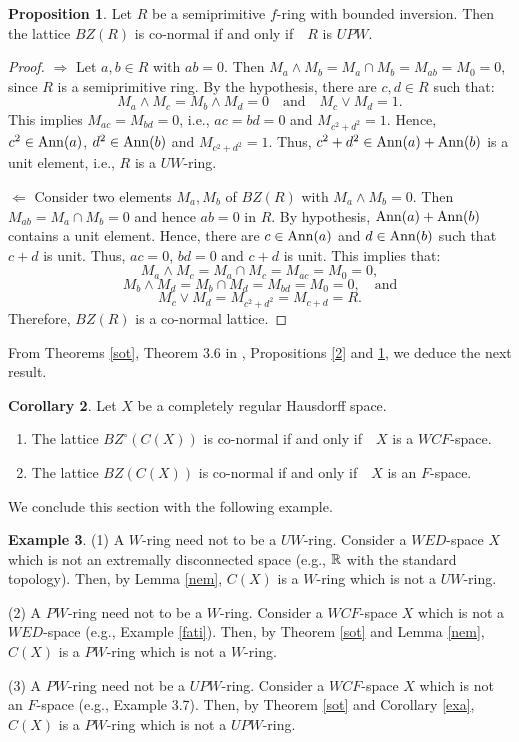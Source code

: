 \documentclass{amsart}
\theoremstyle{definition}
\theoremstyle{remark}
\numberwithin{equation}{section}
\newcommand{\Ann}{{\rm Ann}}
\def\ifif {if and only if\ \ }
\theoremstyle{definition}\newtheorem{thm}{Theorem}[section]
\theoremstyle{definition}\newtheorem{cor}[thm]{Corollary}
\theoremstyle{definition}\newtheorem{lem}[thm]{Lemma}
\theoremstyle{definition}\newtheorem{prop}[thm]{Proposition}
\theoremstyle{definition}\newtheorem{defn}[thm]{Definition}
\theoremstyle{definition}\newtheorem{Rem}[thm]{Remark}
\theoremstyle{remark}\newtheorem{rem}[thm]{Remark}
\theoremstyle{definition}\newtheorem{exam}[thm]{Example}
\theoremstyle{definition}\newtheorem{qu}[thm]{question}
\begin{document}
 \begin{prop}\label{es2}
 Let $R$ be a semiprimitive $f$-ring  with bounded inversion. Then the lattice $BZ(R)$ is co-normal \ifif $R$ is $UPW$.
 \end{prop}
 \begin{proof}
 $\Rightarrow$ Let $a, b\in R$ with $ab=0$. Then $M_a\wedge M_b=M_a\cap M_b=M_{ab}=M_{0}=0$, since $R$ is a semiprimitive ring. By the hypothesis, there are $c, d\in R$ such that: \[M_a\wedge M_c=M_b\wedge M_d=0\quad\text{and}\quad M_c\vee M_d=1.\] This implies $M_{ac}=M_{bd}=0$, i.e.,  $ac=bd=0$ and $M_{c^2+ d^2}=1$. Hence, $c^2\in\Ann(a)$, $d^2\in\Ann(b)$ and $M_{c^2+ d^2}=1$. Thus, $c^2+ d^2\in \Ann(a)+ \Ann(b)$ is a unit  element, i.e., $R$ is a $UW$-ring.
 
 $\Leftarrow$ Consider two elements $M_a, M_b$ of $BZ(R)$ with $M_a\wedge M_b=0$. Then $M_{ab}=M_a\cap M_b=0$ and hence $ab=0$ in $R$. By hypothesis, $\Ann(a)+ \Ann(b)$ contains a unit element. Hence, there are $c\in\Ann(a)$ and $d\in\Ann(b)$ such that $c+ d$ is unit. Thus, $ac=0$, $bd=0$ and $c+d$ is unit. This implies that: \[M_a\wedge M_c=M_a\cap M_c=M_{ac}=M_0=0,\] \[M_b\wedge M_d=M_b\cap M_d=M_{bd}=M_0=0,\quad\text{and}\]  \[M_c\vee M_d=M_{c^2+ d^2}=M_{c+d}=R.\]Therefore, $BZ(R)$ is a co-normal lattice.
 \end{proof}
 From Theorems \ref{sot}, Theorem 3.6 in \cite{AlTaTa},  Propositions \ref{2} and \ref{es2}, we deduce the next result.
 \begin{cor}
 Let $X$ be a completely regular Hausdorff space. 
 \begin{enumerate}
 \item The lattice $BZ^{\circ}(C(X))$ is co-normal \ifif $X$ is a $WCF$-space.
 
 \item The lattice $BZ(C(X))$ is co-normal \ifif $X$ is an $F$-space.
 \end{enumerate}
 \end{cor}
We conclude this section with the following example.
\begin{exam}
(1) A $W$-ring need not to be a $UW$-ring. Consider a $WED$-space $X$  which is not an extremally disconnected space (e.g., $\Bbb R$ with the standard topology). Then, by Lemma \ref{nem}, $C(X)$ is a $W$-ring which is not a $UW$-ring.
    
 (2) A $PW$-ring need not to be a $W$-ring. Consider a $WCF$-space $X$ which is not a $WED$-space (e.g., Example \ref{fati}). Then, by  Theorem \ref{sot} and Lemma \ref{nem}, $C(X)$ is a $PW$-ring which is not a $W$-ring.
 
 (3) A $PW$-ring need not be a $UPW$-ring. Consider a $WCF$-space $X$ which is not an $F$-space (e.g., Example 3.7). Then,  by  Theorem \ref{sot} and Corollary \ref{exa}, $C(X)$ is a $PW$-ring which is not a $UPW$-ring.
 \end{exam}   
\end{document}
